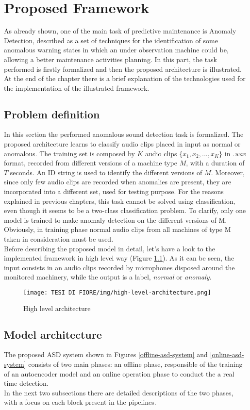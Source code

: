 \chapter{Proposed Framework}
As already shown, one of the main task of predictive maintenance is Anomaly Detection, described as a set of techniques for the identification of some anomalous warning states in which an under observation machine could be, allowing a better maintenance activities planning. In this part, the task performed is firstly formalized and then the proposed architecture is illustrated. At the end of the chapter there is a brief explanation of the technologies used for the implementation of the illustrated framework.
\section{Problem definition}
In this section the performed anomalous sound detection task is formalized. The proposed architecture learns to classify audio clips placed in input as normal or anomalous. The training set is composed by $K$ audio clips $\{x_1, x_2, ...,x_K\}$ in \textit{.wav} format, recorded from different versions of a machine type $M$, with a duration of $T$ seconds. An ID string is used to identify the different versions of $M$. Moreover, since only few audio clips are recorded when anomalies are present, they are incorporated into a different set, used for testing purpose. For the reasons explained in previous chapters, this task cannot be solved using classification, even though it seems to be a two-class classification problem. To clarify, only one model is trained to make anomaly detection on the different versions of M. Obviously, in training phase normal audio clips from all machines of type M taken in consideration must be used.\\
Before describing the proposed model in detail, let’s have a look to the implemented framework in high level way (Figure \ref{high-level-architecture}). As it can be seen, the input consists in an audio clips recorded by microphones disposed around the monitored machinery, while the output is a label, \textit{normal} or \textit{anomaly}.
\begin{figure}[ht]
\texttt{[image: TESI DI FIORE/img/high-level-architecture.png]}
\centering
\caption{High level architecture \cite{DCASE}}
\label{high-level-architecture}
\end{figure}

\section{Model architecture}
The proposed ASD system shown in Figures \ref{offline-asd-system} and \ref{online-asd-system} consists of two main phases: an offline phase, responsible of the training of an autoencoder model and an online operation phase to conduct the a real time detection.\\
In the next two subsections there are detailed descriptions of the two phases, with a focus on each block present in the pipelines.
